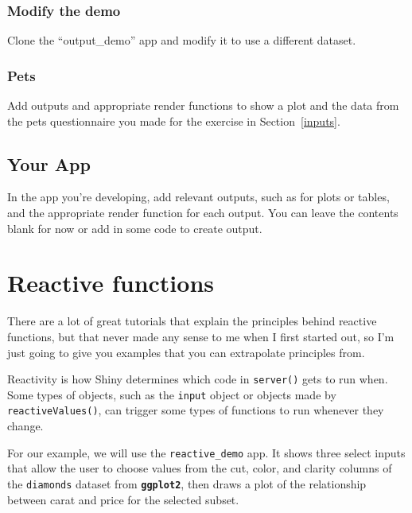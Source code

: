 \documentclass[
  oneside]{book}
\begin{document}
\hypertarget{modify-the-demo}{%
\subsection*{Modify the demo}\label{modify-the-demo}}

Clone the ``output\_demo'' app and modify it to use a different dataset.

\hypertarget{pets-1}{%
\subsection*{Pets}\label{pets-1}}

Add outputs and appropriate render functions to show a plot and the data from the pets questionnaire you made for the exercise in Section~\ref{inputs}.

\hypertarget{your-app-outputs}{%
\section{Your App}\label{your-app-outputs}}

In the app you're developing, add relevant outputs, such as for plots or tables, and the appropriate render function for each output. You can leave the contents blank for now or add in some code to create output.

\hypertarget{reactives}{%
\chapter{Reactive functions}\label{reactives}}

There are a lot of great tutorials that explain the principles behind reactive functions, but that never made any sense to me when I first started out, so I'm just going to give you examples that you can extrapolate principles from.

Reactivity is how Shiny determines which code in \texttt{server}\texttt{()} gets to run when. Some types of objects, such as the \texttt{input} object or objects made by \texttt{reactiveValues}\texttt{()}, can trigger some types of functions to run whenever they change.

For our example, we will use the \texttt{reactive\_demo} app. It shows three select inputs that allow the user to choose values from the cut, color, and clarity columns of the \texttt{diamonds} dataset from \textbf{\texttt{ggplot2}}, then draws a plot of the relationship between carat and price for the selected subset.
\end{document}
